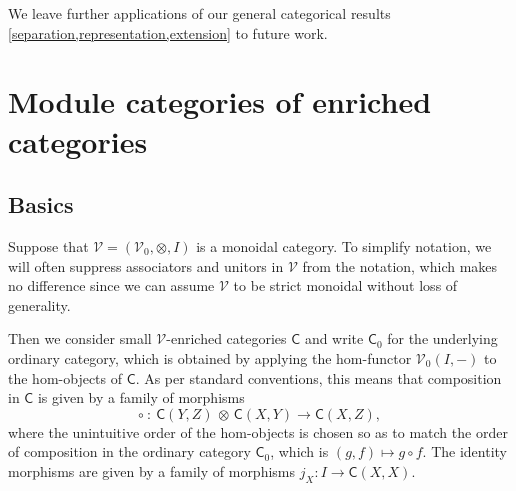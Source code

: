 \documentclass[11pt,onecolumn]{article}
\newcommand{\cV}{\mathscr{V}}
\newcommand{\cC}{\mathsf{C}}
\theoremstyle{plain}
\theoremstyle{remark}
\theoremstyle{definition}
\begin{document}

We leave further applications of our general categorical results \cref{separation,representation,extension} to future work.

\section{Module categories of enriched categories}
\label{sec:module_categories}

\subsection{Basics}

Suppose that $\cV=(\cV_0,\otimes,I)$ is a monoidal category.
To simplify notation, we will often suppress associators and unitors in $\cV$ from the notation, which makes no difference since we can assume $\cV$ to be strict monoidal without loss of generality.

Then we consider small $\cV$-enriched categories $\cC$ and write $\cC_0$ for the underlying ordinary category,
which is obtained by applying the hom-functor $\cV_0(I, -)$ to the hom-objects of $\cC$.
As per standard conventions, this means that composition in $\cC$ is given by a family of morphisms
\[
	\circ \: : \: \cC(Y, Z) \,\otimes\, \cC(X, Y) \longrightarrow \cC(X, Z),
\]
where the unintuitive order of the hom-objects is chosen so as to match the order of composition in the ordinary category $\cC_0$, which is $(g, f) \mapsto g \circ f$.
The identity morphisms are given by a family of morphisms $j_X : I \to \cC(X, X)$.
\end{document}
